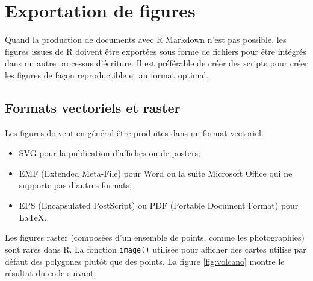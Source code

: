\documentclass[
  11pt,
  french,
  a4paper,
  extrafontsizes,onecolumn,openright
  ]{memoir}
\providecommand{\tightlist}{%
  \setlength{\itemsep}{0pt}\setlength{\parskip}{0pt}}
\begin{document}
\normalsize

\hypertarget{exportation-de-figures}{%
\section{Exportation de figures}\label{exportation-de-figures}}

Quand la production de documents avec R Markdown n'est pas possible, les figures issues de R doivent être exportées sous forme de fichiers pour être intégrés dans un autre processus d'écriture.
Il est préférable de créer des scripts pour créer les figures de façon reproductible et au format optimal.

\hypertarget{formats-vectoriels-et-raster}{%
\subsection{Formats vectoriels et raster}\label{formats-vectoriels-et-raster}}

Les figures doivent en général être produites dans un format vectoriel:

\begin{itemize}
\tightlist
\item
  SVG pour la publication d'affiches ou de posters;
\item
  EMF (Extended Meta-File) pour Word ou la suite Microsoft Office qui ne supporte pas d'autres formats;
\item
  EPS (Encapsulated PostScript) ou PDF (Portable Document Format) pour LaTeX.
\end{itemize}

Les figures raster (composées d'un ensemble de points, comme les photographies) sont rares dans R.
La fonction \texttt{image()} utilisée pour afficher des cartes utilise par défaut des polygones plutôt que des points.
La figure \ref{fig:volcano} montre le résultat du code suivant:



\scriptsize
\end{document}
